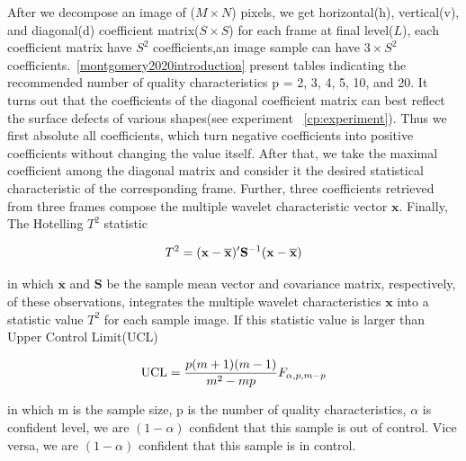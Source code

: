 After we decompose an image of ($M \times N$) pixels, we get horizontal(h), vertical(v), and diagonal(d) coefficient matrix($S \times S$) for each frame at final level($L$), each coefficient matrix have $S^2$ coefficients,an image sample can have $3 \times S^2$ coefficients.~\ref{montgomery2020introduction} present tables indicating the recommended number of quality characteristics p = 2, 3, 4, 5, 10, and 20. It turns out that the coefficients of the diagonal coefficient matrix can best reflect the surface defects of various shapes(see experiment ~\ref{cp:experiment}). Thus we first absolute all coefficients, which turn negative coefficients into positive coefficients without changing the value itself. After that, we take the maximal coefficient among the diagonal matrix and consider it the desired statistical characteristic of the corresponding frame. Further, three coefficients retrieved from three frames compose the multiple wavelet characteristic vector $\mathbf{x}$. Finally, The Hotelling $T^{2}$ statistic

\begin{equation}
\centering T^{2}=(\mathbf{x}-\overline{\mathbf{x}})^{\prime} \mathbf{S}^{-1}(\mathbf{x}-\overline{\mathbf{x}}) \label{equa:T2}
\end{equation}

in which $\overline{\mathbf{x}}$ and $\mathbf{S}$ be the sample mean vector and
covariance matrix, respectively, of these observations,
integrates the multiple wavelet characteristics $\mathbf{x}$ into a statistic value $T^{2}$ for each sample image.
If this statistic value is larger than Upper Control Limit(UCL)

\begin{equation}
\centering \mathrm{UCL}=\frac{p(m+1)(m-1)}{m^{2}-m p} F_{\alpha, p, m-p}
\label{equa:UCL}
\end{equation}

in which m is the sample size, p is the number of quality characteristics, $\alpha$ is confident level,
we are $(1 - \alpha)$ confident that this sample is out of control. Vice versa, we are $(1- \alpha)$ confident that this sample is in control.


